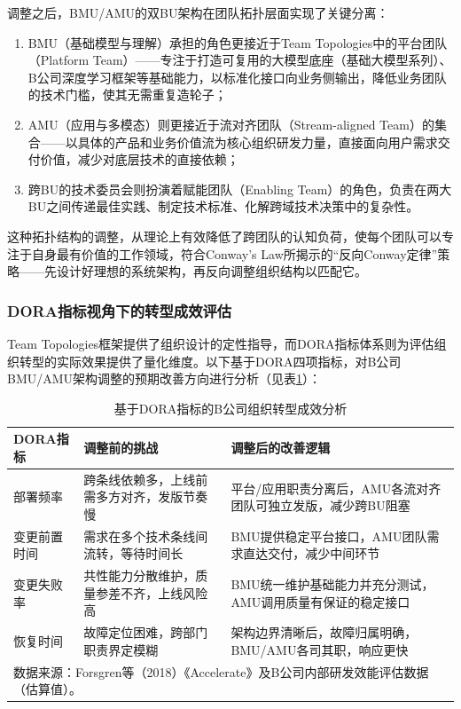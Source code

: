 调整之后，BMU/AMU的双BU架构在团队拓扑层面实现了关键分离：

\begin{enumerate}
\item BMU（基础模型与理解）承担的角色更接近于Team Topologies中的平台团队（Platform Team）——专注于打造可复用的大模型底座（基础大模型系列）、B公司深度学习框架等基础能力，以标准化接口向业务侧输出，降低业务团队的技术门槛，使其无需重复造轮子；
\item AMU（应用与多模态）则更接近于流对齐团队（Stream-aligned Team）的集合——以具体的产品和业务价值流为核心组织研发力量，直接面向用户需求交付价值，减少对底层技术的直接依赖；
\item 跨BU的技术委员会则扮演着赋能团队（Enabling Team）的角色，负责在两大BU之间传递最佳实践、制定技术标准、化解跨域技术决策中的复杂性。
\end{enumerate}

这种拓扑结构的调整，从理论上有效降低了跨团队的认知负荷，使每个团队可以专注于自身最有价值的工作领域，符合Conway's Law所揭示的“反向Conway定律”策略——先设计好理想的系统架构，再反向调整组织结构以匹配它。

\subsubsection{DORA指标视角下的转型成效评估}

Team Topologies框架提供了组织设计的定性指导，而DORA指标体系则为评估组织转型的实际效果提供了量化维度。以下基于DORA四项指标，对B公司BMU/AMU架构调整的预期改善方向进行分析（见表\ref{tab:dora-analysis}）：

\begin{table}[htbp]
\centering
\caption{基于DORA指标的B公司组织转型成效分析}
\label{tab:dora-analysis}
\begin{tabular}{p{3cm}p{4cm}p{5cm}}
\toprule
\textbf{DORA指标} & \textbf{调整前的挑战} & \textbf{调整后的改善逻辑} \\
\midrule
部署频率 & 跨条线依赖多，上线前需多方对齐，发版节奏慢 & 平台/应用职责分离后，AMU各流对齐团队可独立发版，减少跨BU阻塞 \\
变更前置时间 & 需求在多个技术条线间流转，等待时间长 & BMU提供稳定平台接口，AMU团队需求直达交付，减少中间环节 \\
变更失败率 & 共性能力分散维护，质量参差不齐，上线风险高 & BMU统一维护基础能力并充分测试，AMU调用质量有保证的稳定接口 \\
恢复时间 & 故障定位困难，跨部门职责界定模糊 & 架构边界清晰后，故障归属明确，BMU/AMU各司其职，响应更快 \\
\bottomrule
\multicolumn{3}{l}{\small 数据来源：Forsgren等（2018）《Accelerate》及B公司内部研发效能评估数据（估算值）。}\\
\end{tabular}
\end{table}

